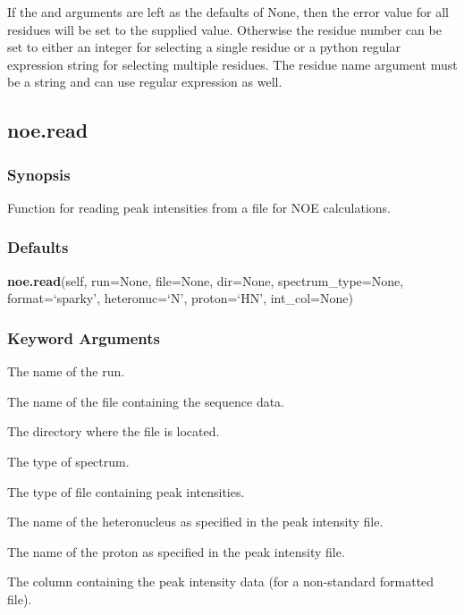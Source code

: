 If the 
 and 
 arguments are left as the defaults of None, then the error
value for all residues will be set to the supplied value.  Otherwise the residue number can
be set to either an integer for selecting a single residue or a python regular expression
string for selecting multiple residues.  The residue name argument must be a string and can
use regular expression as well.


\newpage

\subsection{noe.read}


\subsubsection{Synopsis}

Function for reading peak intensities from a file for NOE calculations.

\subsubsection{Defaults}

\textsf{\textbf{noe.read}(self, run=None, file=None, dir=None, spectrum\_type=None, format=`sparky', heteronuc=`N', proton=`HN', int\_col=None)}


\subsubsection{Keyword Arguments}


  The name of the run.

  The name of the file containing the sequence data.

  The directory where the file is located.

  The type of spectrum.

  The type of file containing peak intensities.

  The name of the heteronucleus as specified in the peak intensity file.

  The name of the proton as specified in the peak intensity file.

  The column containing the peak intensity data (for a non-standard formatted file).

